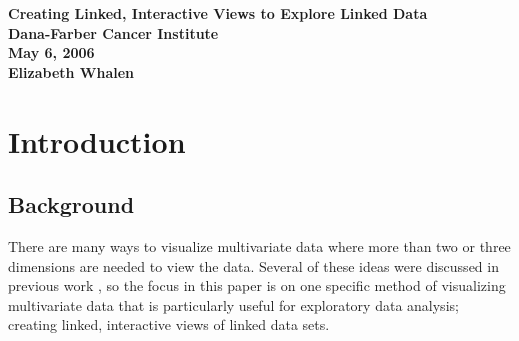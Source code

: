 \documentclass{article}[11pt]
\begin{document}


\begin{titlepage}
\begin{center}
\Large
\vspace*{1in}
\textbf{Creating Linked, Interactive Views to \linebreak Explore Linked Data} \\
\vspace{1in}
\textbf{Dana-Farber Cancer Institute}\\ 
\textbf{May 6, 2006} \\
\vspace{1in} 
\textbf{Elizabeth Whalen} \\
\end{center}
\end{titlepage}
\normalsize
\newpage

\section{Introduction}\label{Sec:Intro}

\subsection{Background}\label{Ssec:Backg}

There are many ways to visualize multivariate data where more than
two or three dimensions are needed to view the data.  Several of these ideas
were discussed in previous work \cite{EW05}, so the focus in this paper
is on one specific method of visualizing multivariate data that is
particularly useful for exploratory data analysis; creating linked,
interactive views of linked data sets.  
\end{document}
